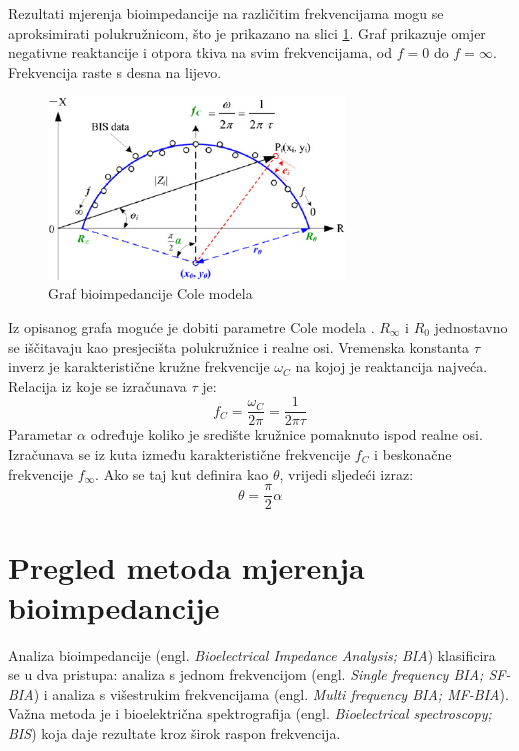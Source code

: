 \documentclass[../diplomski_rad.tex]{subfiles}
\begin{document}
Rezultati mjerenja bioimpedancije na različitim frekvencijama mogu se aproksimirati polukružnicom,  
što je prikazano na slici \ref{slk:cole_graf}. 
Graf prikazuje omjer negativne reaktancije i otpora tkiva na svim frekvencijama, 
od $f=0$ do $f=\infty$. Frekvencija raste s desna na lijevo. 
\begin{figure}[htb]
    \centering
    \includegraphics[width=0.7\textwidth]{Figures/cole_plot.png} 
    \caption{Graf bioimpedancije Cole modela \cite{Yang_2013}}
    \label{slk:cole_graf}
\end{figure}
Iz opisanog grafa moguće je dobiti parametre Cole modela \cite{Yang_2013}.
$R_{\infty}$ i $R_{0}$ jednostavno se iščitavaju kao presjecišta polukružnice i realne osi.
Vremenska konstanta $\tau$ inverz je karakteristične kružne frekvencije $\omega_{C}$ na kojoj je reaktancija najveća.
Relacija iz koje se izračunava $\tau$ je:
\begin{equation}
    \label{jed:cole}
    f_{C} = \frac{\omega_{C}}{2\pi} = \frac{1}{2\pi\tau} 
\end{equation} 
Parametar $\alpha$ određuje koliko je središte kružnice pomaknuto ispod realne osi. 
Izračunava se iz kuta između karakteristične frekvencije $f_{C}$ i beskonačne frekvencije $f_{\infty}$. 
Ako se taj kut definira kao $\theta$, vrijedi sljedeći izraz:
\begin{equation}
    \label{jed:cole}
    \theta = \frac{\pi}{2}\alpha 
\end{equation} 

\section{Pregled metoda mjerenja bioimpedancije}
Analiza bioimpedancije (engl. \textit{Bioelectrical Impedance Analysis; BIA}) klasificira se u dva pristupa: 
analiza s jednom frekvencijom (engl. \textit{Single frequency BIA; SF-BIA}) 
i analiza s višestrukim frekvencijama (engl. \textit{Multi frequency BIA; MF-BIA}).
Važna metoda je i bioelektrična spektrografija (engl. \textit{Bioelectrical spectroscopy; BIS}) 
koja daje rezultate kroz širok raspon frekvencija. 
\end{document}
